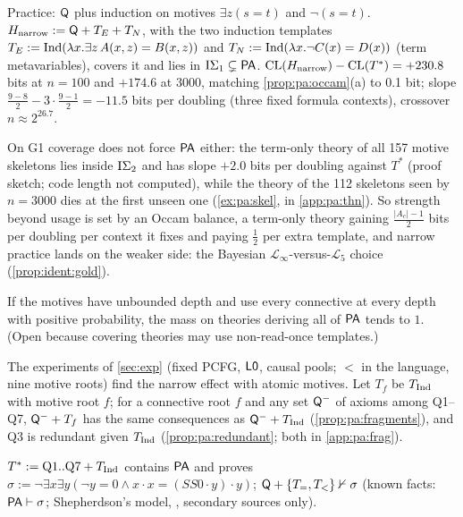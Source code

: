 \begin{example}\pabrk{}\label{ex:pa:narrow}
Practice: $\mathsf{Q}$ plus induction on motives $\exists z(s=t)$ and $\neg(s=t)$. $H_{\mathrm{narrow}}:=\mathsf{Q}+T_E+T_N$, with the two induction templates $T_E:=\mathrm{Ind}(\lambda x.\exists z\,A(x,z)=B(x,z))$ and $T_N:=\mathrm{Ind}(\lambda x.\neg C(x)=D(x))$ (term metavariables), covers it and lies in $\mathrm{I}\Sigma_{1}\subsetneq\mathsf{PA}$. $\mathrm{CL}(H_{\mathrm{narrow}})-\mathrm{CL}(T^*)=+230.8$ bits at $n=100$ and $+174.6$ at $3000$, matching \cref{prop:pa:occam}(a) to 0.1 bit; slope $\frac{9-8}2-3\cdot\frac{9-1}2=-11.5$ bits per doubling (three fixed formula contexts), crossover $n\approx2^{26.7}$.
\end{example}

\noindent On G1 coverage does not force $\mathsf{PA}$ either: the term-only theory of all 157 motive skeletons lies inside $\mathrm{I}\Sigma_{2}$ and has slope $+2.0$ bits per doubling against $T^*$ (proof sketch; code length not computed), while the theory of the 112 skeletons seen by $n=3000$ dies at the first unseen one (\cref{ex:pa:skel}, in \cref{app:pa:thn}). So strength beyond usage is set by an Occam balance, a term-only theory gaining $\frac{|A_c|-1}2$ bits per doubling per context it fixes and paying $\frac12$ per extra template, and narrow practice lands on the weaker side: the Bayesian $\mathcal L_\infty$-versus-$\mathcal L_5$ choice (\cref{prop:ident:gold}).

\begin{conjecture}\pabrk{}\label{conj:pa:broad}
If the motives have unbounded depth and use every connective at every depth with positive probability, the mass on theories deriving all of $\mathsf{PA}$ tends to $1$. (Open because covering theories may use non-read-once templates.)
\end{conjecture}

\noindent The experiments of \cref{sec:exp} (fixed PCFG, $\mathord{\mathsf{L0}}$, causal pools; $<$ in the language, nine motive roots) find the narrow effect with atomic motives. Let $T_f$ be $T_{\mathrm{Ind}}$ with motive root $f$; for a connective root $f$ and any set $\mathsf{Q}^-$ of axioms among Q1--Q7, $\mathsf{Q}^-+T_f$ has the same consequences as $\mathsf{Q}^-+T_{\mathrm{Ind}}$ (\cref{prop:pa:fragments}), and Q3 is redundant given $T_{\mathrm{Ind}}$ (\cref{prop:pa:redundant}; both in \cref{app:pa:frag}).

\begin{proposition}\pabrk{}\label{prop:pa:atomic}
$T^*:=\mathrm{Q1..Q7}+T_{\mathrm{Ind}}$ contains $\mathsf{PA}$ and proves $\sigma:=\neg\exists x\exists y(\neg y=0\wedge x\cdot x=(SS0\cdot y)\cdot y)$; $\mathsf{Q}+\{T_=,T_<\}\nvdash\sigma$ (known facts: $\mathsf{PA}\vdash\sigma$; Shepherdson's model, \citealp{shepherdson1964nonstandard}, secondary sources only).
\end{proposition}

